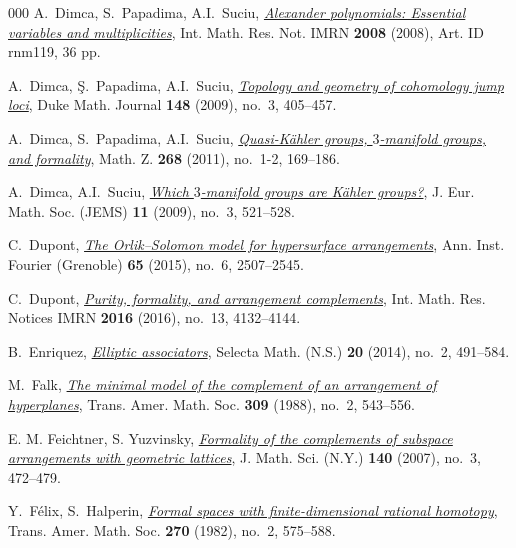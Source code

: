 \documentclass{article}
\numberwithin{equation}{section}
\theoremstyle{definition}
\begin{document}
\begin{thebibliography}{000}
 A.~Dimca, S.~Papadima, A.I.~Suciu,
\href{https://dx.doi.org/10.1093/imrn/rnm119}%
{\em Alexander polynomials: Essential variables and multiplicities},
Int. Math. Res. Not. IMRN \textbf{2008} (2008), Art. ID rnm119, 36 pp.

 A.~Dimca, \c{S}.~Papadima, A.I.~Suciu,
\href{https://dx.doi.org/10.1215/00127094-2009-030}%
{\em Topology and geometry of cohomology jump loci}, 
Duke Math. Journal \textbf{148} (2009), no.~3, 405--457.

 A.~Dimca, S.~Papadima, A.I.~Suciu,
\href{http://dx.doi.org/10.1007/s00209-010-0664-y}%
{\em Quasi-K\"{a}hler groups, $3$-manifold groups, and 
formality}, Math. Z. \textbf{268} (2011), no.~1-2, 169--186.  

 A.~Dimca, A.I.~Suciu,
\href{http://dx.doi.org/10.4171/JEMS/158}%
{\em Which $3$-manifold groups are K\"{a}hler groups?}, 
J. Eur. Math. Soc. (JEMS) \textbf{11} (2009), no.~3, 521--528.  

 C.~Dupont, 
\href{https://dx.doi.org/10.5802/aif.2994}%
{\em The Orlik--Solomon model for hypersurface arrangements}, 
Ann. Inst. Fourier (Grenoble) \textbf{65} (2015), no.~6, 2507--2545. 

 C.~Dupont, 
\href{https://dx.doi.org/10.1093/imrn/rnv260}%
{\em Purity, formality, and arrangement complements}, 
Int. Math. Res. Notices IMRN \textbf{2016} (2016), 
no.~13, 4132--4144.

 B.~Enriquez, 
\href{https://dx.doi.org/10.1007/s00029-013-0137-3}%
{\em Elliptic associators}, 
Selecta Math. (N.S.) \textbf{20} (2014), no.~2, 491--584. 

 M.~Falk, 
\href{https://dx.doi.org/10.2307/2000924}%
{\em The minimal model of the complement of an arrangement 
of hyperplanes}, Trans. Amer. Math. Soc. \textbf{309} (1988), 
no.~2, 543--556. 

 E. M. Feichtner, S. Yuzvinsky, 
\href{https://dx.doi.org/10.1007/s10958-007-0454-1}%
{\em Formality of the complements of subspace arrangements 
with geometric lattices}, J. Math. Sci. (N.Y.) \textbf{140} (2007), 
no.~3, 472--479.

 Y.~F{\'e}lix, S.~Halperin, 
\href{https://dx.doi.org/10.2307/1999862}%
{\em Formal spaces with finite-dimensional rational homotopy}, 
Trans. Amer. Math. Soc. \textbf{270} (1982), no.~2, 575--588. 


\end{thebibliography}
\end{document}
